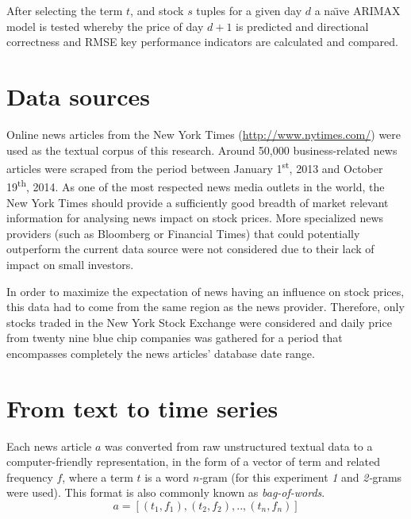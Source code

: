 \documentclass[conference,11pt]{IEEEtran}
\begin{document}
\par
After selecting the term \(t\), and stock \(s\) tuples for a given day \(d\) a na\"{\i}ve ARIMAX model is tested whereby the price of day \(d+1\) is predicted and directional correctness and RMSE key performance indicators are calculated and compared.

\section{Data sources}
Online news articles from the New York Times (\url{http://www.nytimes.com/}) were used as the textual corpus of this research. Around 50,000 business-related news articles were scraped from the period between January 1\textsuperscript{st}, 2013 and October 19\textsuperscript{th}, 2014. As one of the most respected news media outlets in the world, the New York Times should provide a sufficiently good breadth of market relevant information for analysing news impact on stock prices. More specialized news providers (such as Bloomberg or Financial Times) that could potentially outperform the current data source were not considered due to their lack of impact on small investors.

\par
In order to maximize the expectation of news having an influence on stock prices, this data had to come from the same region as the news provider. Therefore, only stocks traded in the New York Stock Exchange were considered and daily price from twenty nine blue chip companies was gathered for a period that encompasses completely the news articles' database date range.

\section{From text to time series}
Each news article \(a\) was converted from raw unstructured textual data to a computer-friendly representation, in the form of a vector of term and related frequency \(f\), where a term \(t\) is a word \textit{n-}gram (for this experiment \textit{1} and \textit{2-}grams were used). This format is also commonly known as \textit{bag-of-words}.
\[a=[(t_1,f_1),(t_2,f_2),..,(t_n,f_n)]\]
\end{document}
